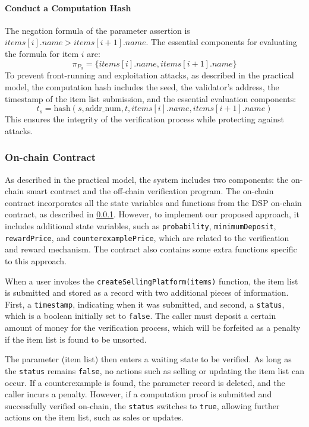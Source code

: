 \documentclass[runningheads]{llncs}
\begin{document}
\paragraph{Conduct a Computation Hash}
The negation formula of the parameter assertion is \( items[i].name > items[i+1].name \). The essential components for evaluating the formula for item \( i \) are:
\[
\pi_{P_{a}} = \{ items[i].name, items[i + 1].name \}
\]
To prevent front-running and exploitation attacks, as described in the practical model, the computation hash includes the seed, the validator's address, the timestamp of the item list submission, and the essential evaluation components:
\[
t_s = \text{hash}(s, \text{addr\_num}, t, items[i].name, items[i + 1].name)
\]
This ensures the integrity of the verification process while protecting against attacks.
\subsubsection{On-chain Contract}
As described in the practical model, the system includes two components: the on-chain smart contract and the off-chain verification program. The on-chain contract incorporates all the state variables and functions from the DSP on-chain contract, as described in \ref{}. However, to implement our proposed approach, it includes additional state variables, such as \texttt{probability}, \texttt{minimumDeposit}, \texttt{rewardPrice}, and \texttt{counterexamplePrice}, which are related to the verification and reward mechanism. The contract also contains some extra functions specific to this approach.

When a user invokes the \texttt{createSellingPlatform(items)} function, the item list is submitted and stored as a record with two additional pieces of information. First, a \texttt{timestamp}, indicating when it was submitted, and second, a \texttt{status}, which is a boolean initially set to \texttt{false}. The caller must deposit a certain amount of money for the verification process, which will be forfeited as a penalty if the item list is found to be unsorted.

The parameter (item list) then enters a waiting state to be verified. As long as the \texttt{status} remains \texttt{false}, no actions such as selling or updating the item list can occur. If a counterexample is found, the parameter record is deleted, and the caller incurs a penalty. However, if a computation proof is submitted and successfully verified on-chain, the \texttt{status} switches to \texttt{true}, allowing further actions on the item list, such as sales or updates.
\end{document}
